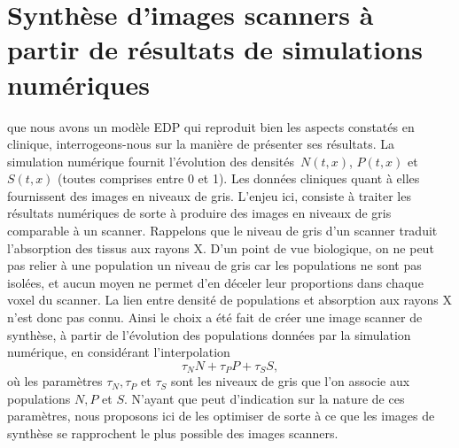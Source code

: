 \documentclass[main.tex]{subfiles}
\begin{document}
\chapter{Synthèse d'images scanners à partir de résultats de simulations numériques \label{chap:optim_grey}}


 que nous avons un modèle EDP qui reproduit bien les aspects constatés en clinique, interrogeons-nous sur la manière de présenter ses résultats. La simulation numérique fournit  l'évolution des densités~$N(t,x)$, $P(t,x)$ et~$S(t,x)$ (toutes comprises entre 0 et 1). 
Les données cliniques quant à elles fournissent des images en niveaux de gris. 
L'enjeu ici, consiste à traiter les résultats numériques de sorte à produire des images en niveaux de gris comparable à un scanner. 
Rappelons que le niveau de gris d'un scanner traduit l'absorption des tissus aux rayons X. D'un point de vue biologique, on ne peut pas relier à une population un niveau de gris car les populations ne sont pas isolées, et aucun moyen %
ne permet d'en déceler leur proportions dans chaque voxel du scanner. La lien entre densité de populations et absorption aux rayons X n'est donc pas connu. Ainsi le choix a été fait de créer une image scanner de synthèse, à partir de l'évolution des populations données par la simulation numérique, en considérant l'interpolation 
\begin{equation}\label{eq:nvx_gris}
\tau_N N + \tau_P P + \tau_S S,
\end{equation}
où les paramètres $\tau_N, \tau_P$ et $\tau_S$ sont les niveaux de gris que l'on associe aux populations $N,P$ et $S$. N'ayant que peut d'indication sur la nature de ces paramètres, nous proposons ici de les optimiser de sorte à ce que les images de synthèse se rapprochent le plus possible des images scanners. 
\end{document}
